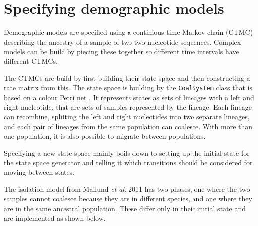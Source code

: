 \documentclass[11pt]{article}
\begin{document}
\section{Specifying demographic models}

Demographic models are specified using a continious time Markov chain (CTMC) describing the ancestry of a sample of two two-nucleotide sequences. Complex models can be build by piecing these together so different time intervals have different CTMCs.

The CTMCs are build by first building their state space and then constructing a rate matrix from this. The state space is building by the \texttt{CoalSystem} class that is based on a colour Petri net \cite{springerlink:10.1007/978-3-642-31131-4_3}. It represents states as sets of lineages with a left and right nucleotide, that are sets of samples represented by the lineage. Each lineage can recombine, splitting the left and right nucleotides into two separate lineages, and each pair of lineages from the same population can coalesce. With more than one population, it is also possible to migrate between populations.

Specifying a new state space mainly boils down to setting up the initial state for the state space generator and telling it which transitions should be considered for moving between states.

The isolation model from Mailund \emph{et al.} 2011 \cite{Mailund:2011dv} has two phases, one where the two samples cannot coalesce because they are in different species, and one where they are in the same ancestral population. These differ only in their initial state and are implemented as shown below.
\end{document}
